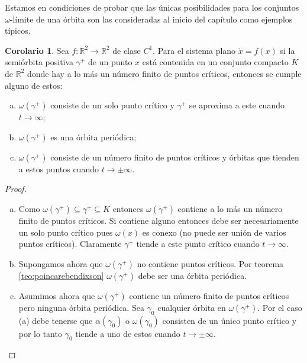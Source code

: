 \documentclass[11pt]{book}
\theoremstyle{definition}
\numberwithin{definition}{section}
\theoremstyle{theorem}
\newtheorem{corollary}{Corolario}
\numberwithin{theorem}{section}
\numberwithin{lemma}{section}
\numberwithin{corollary}{section}
\theoremstyle{plain}
\numberwithin{example}{section}
\newcommand{\R}{{\ensuremath{\mathbb{R}}}}
\begin{document}
Estamos en condiciones de probar que las únicas posibilidades para los conjuntos $\omega$-límite de una órbita son las consideradas al inicio del capítulo como ejemplos típicos.

\begin{corollary} \label{teo:poincarebendixson2} Sea $f: \R^2 \to \R^2$ de clase $C^1$. Para el sistema plano $\dot{x} = f(x)$ si la semiórbita positiva $\gamma^+$ de un punto $x$ está contenida en un conjunto compacto $K$ de $\R^2$ donde hay a lo más un número finito de puntos críticos, entonces se cumple alguno de estos:

	\begin{enumerate}[(a)]
		\item $\omega(\gamma^+)$ consiste de un solo punto crítico  y $\gamma^+$ se aproxima a este cuando $t \to \infty$;
		\item $\omega(\gamma^+)$ es una órbita periódica;
		\item $\omega(\gamma^+)$ consiste de un número finito de puntos críticos y órbitas que tienden a estos puntos cuando $t \to \pm \infty$.
	\end{enumerate}
\end{corollary}

\begin{proof}
\begin{enumerate}[(a)]
	\item Como $\omega(\gamma^+) \subseteq \overline{\gamma^+} \subseteq K$ entonces $\omega(\gamma^+)$ contiene a lo más un número finito de puntos críticos. Si contiene alguno entonces debe ser necesariamente un solo punto crítico pues $\omega(x)$ es conexo (no puede ser unión de varios puntos críticos). Claramente $\gamma^+$ tiende a este punto crítico cuando $t \to \infty$.
	\item Supongamos ahora que $\omega(\gamma^+)$ no contiene puntos críticos. Por teorema \ref{teo:poincarebendixson} $\omega(\gamma^+)$ debe ser una órbita periódica.
	\item Asumimos ahora que $\omega(\gamma^+)$ contiene un número finito de puntos críticos pero ninguna órbita periódica. Sea $\gamma_0$ cualquier órbita en $\omega(\gamma^+)$. Por el caso (a) debe tenerse que $\alpha(\gamma_0)$ o $\omega(\gamma_0)$ consisten de un único punto crítico y por lo tanto $\gamma_0$ tiende a uno de estos cuando $t \to \pm \infty$.
\end{enumerate}
\end{proof}
\end{document}
